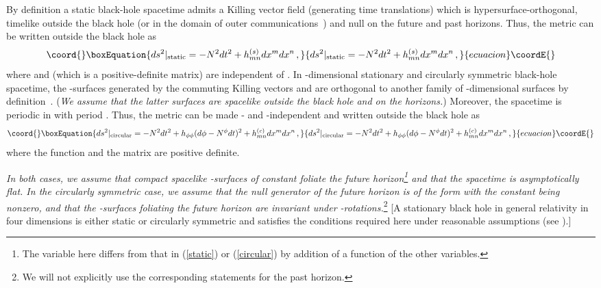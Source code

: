\documentclass[a4paper,12pt]{article}
\begin{document}
By definition a static black-hole spacetime admits a Killing vector field
(generating time translations) 
which is hypersurface-orthogonal, timelike outside
the black hole (or in the domain of outer communications~\cite{Carter}) and
null on the future and past horizons. 
Thus, the metric 
can be written outside the black hole as 
\begin{equation}\coord{}\boxEquation{
ds^2|_{\rm static} = -N^2 dt^2 + h^{(s)}_{mn}dx^m dx^n\,,
\label{static}
}{
ds^2|_{\rm static} = -N^2 dt^2 + h^{(s)}_{mn}dx^m dx^n\,,
}{ecuacion}\coordE{}\end{equation}
where \coordHE{} and \coordHE{} (which is a positive-definite matrix) are 
independent of \coordHE{}. 
In \coordHE{}-dimensional stationary and circularly symmetric black-hole
spacetime, the \coordHE{}-surfaces generated by the commuting 
Killing vectors \coordHE{}
and \coordHE{} are orthogonal to another
family of \coordHE{}-dimensional surfaces by definition~\cite{Carter,Carter2}. 
({\it We assume that the latter surfaces are spacelike outside the black hole
and on the horizons.})
Moreover, the
spacetime is periodic in \myHighlight{$\phi$}\coordHE{} with period \myHighlight{$2\pi$}\coordHE{}.  Thus, the metric
can be made 
\coordHE{}- and \myHighlight{$\phi$}\coordHE{}-independent and written outside the black hole as 
\begin{equation}\coord{}\boxEquation{
ds^2|_{\rm circular} = -N^2 dt^2 + h_{\phi\phi}(d\phi - N^\phi dt)^2
+ h^{(c)}_{mn}dx^m dx^n\,, \label{circular}
}{
ds^2|_{\rm circular} = -N^2 dt^2 + h_{\phi\phi}(d\phi - N^\phi dt)^2
+ h^{(c)}_{mn}dx^m dx^n\,, }{ecuacion}\coordE{}\end{equation}
where the function \coordHE{} and the matrix \coordHE{} are
positive definite.  

{\it In both cases, we assume that
compact spacelike \coordHE{}-surfaces of constant \coordHE{} foliate the future 
horizon\footnote{The variable \coordHE{}
here differs from that in (\ref{static}) or (\ref{circular}) by
addition of a function of the other variables.}
and that the spacetime is asymptotically flat.
In the circularly symmetric case,
we assume that the null generator of the future horizon is of the form
\coordHE{} 
with the constant \coordHE{} being nonzero,
and that the \coordHE{}-surfaces foliating the future horizon are invariant under
\myHighlight{$\phi$}\coordHE{}-rotations.}\footnote{We will not explicitly 
use the corresponding statements for the past horizon.}
[A stationary black hole
in general relativity in four dimensions is either static or circularly 
symmetric and
satisfies the conditions required here
under reasonable assumptions (see \cite{Hawking,Carter}).]
\end{document}
